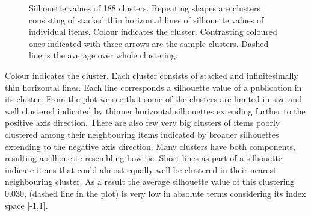 \begin{figure}[htp]
\begin{center}
    \caption{Silhouette values of 188 clusters. Repeating shapes
    are clusters consisting of stacked thin horizontal lines of 
    silhouette values of individual items. Colour indicates the 
    cluster. Contrasting coloured ones indicated with three arrows
    are the sample clusters.
    Dashed line is the average over whole clustering.}
    \label{fig:silh01}
  \end{center}
\end{figure}
Colour indicates the cluster. Each cluster consists of stacked and 
infinitesimally thin horizontal lines. Each line corresponds a
silhouette value of a publication in its cluster. 
From the plot we see that some of the clusters are limited in size
and well clustered indicated by thinner horizontal silhouettes
extending further to the positive axis direction. There are also 
few very big clusters
of items poorly clustered among their neighbouring items indicated 
by broader silhouettes extending to the negative axis direction. Many clusters
have both components, resulting a silhouette resembling bow tie. 
Short lines as part of a silhouette indicate items that could 
almost equally well be clustered in their nearest neighbouring cluster.
As a result the average silhouette value of this clustering $0.030$,
(dashed line in the plot) is 
very low in absolute terms considering its index space [-1,1].

